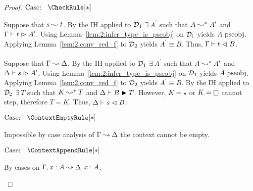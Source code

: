 \begin{proof}
    $\text{Case: }\begin{array}{c} \CheckRule[*] \end{array}$
    \begin{proofcase}
        Suppose that $s \leadsto t$.
        By the IH applied to $\mathcal{D}_{1}$ $\exists\ A^\prime$ such that $A \leadsto^* A^\prime$ and $\Gamma \vdash t \vartriangleright A^\prime$.
        Using Lemma~\ref{lem:2:infer_type_is_pseobj} on $\mathcal{D}_{1}$ yields $A~\mbox{\normalfont pseobj}$.
        Applying Lemma~\ref{lem:2:conv_red_f} to $\mathcal{D}_{2}$ yields $A^\prime \equiv B$.
        Thus, $\Gamma \vdash t \vartriangleleft B$.
        \\ \\
        Suppose that $\Gamma \leadsto \Delta$.
        By the IH applied to $\mathcal{D}_{1}$ $\exists\ A^\prime$ such that $A \leadsto^* A^\prime$ and $\Delta \vdash s \vartriangleright A^\prime$.
        Using Lemma~\ref{lem:2:infer_type_is_pseobj} on $\mathcal{D}_{1}$ yields $A~\mbox{\normalfont pseobj}$.
        Applying Lemma~\ref{lem:2:conv_red_f} to $\mathcal{D}_{2}$ yields $A^\prime \equiv B$.
        By the IH applied to $\mathcal{D}_{2}$ $\exists\ T$ such that $K \leadsto^* T$ and $\Delta \vdash B \blacktriangleright T$.
        However, $K = \star$ or $K = \kind$ cannot step, therefore $T = K$.
        Thus, $\Delta \vdash s \vartriangleleft B$.
    \end{proofcase}

    $\text{Case: }\begin{array}{c} \ContextEmptyRule[*] \end{array}$
    \begin{proofcase}
        Impossible by case analysis of $\Gamma \leadsto \Delta$ the context cannot be empty.
    \end{proofcase}

    $\text{Case: }\begin{array}{c} \ContextAppendRule[*] \end{array}$
    \begin{proofcase}
        By cases on $\Gamma, x : A \leadsto \Delta, x : A$.


    \end{proofcase}
\end{proof}